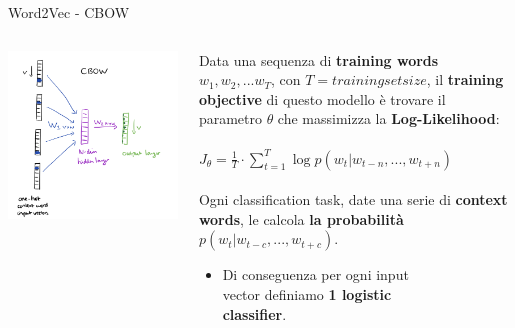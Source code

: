 \documentclass[british]{beamer}
\begin{document}
\begin{frame}{Word2Vec - CBOW}
	\begin{columns}
		\begin{column}{0.4\textwidth}
			\includegraphics[width=1.1\linewidth,height=1.4\textwidth]{./Imgs/cbow}
		\end{column}
		\begin{column}{0.6\textwidth}
			Data una sequenza di \textbf{training words} \(w_1, w_2, ... w_T\), con \(T = trainingsetsize\), il \textbf{training objective} di questo modello \`{e} trovare il parametro \(\theta\) che massimizza la \textbf{Log-Likelihood}:
			\\~\\
			\(J_{\theta} = \frac{1}{T}\cdot\sum_{t=1}^{T}\log p(w_{t}|w_{t-n}, ... , w_{t+n})\)
			\\~\\
			Ogni classification task, date una serie di \textbf{context words}, le  calcola \textbf{la probabilit\`{a}} \(p(w_{t}|w_{t-c}, ... , w_{t+c})\).
			\begin{itemize}
				\item Di conseguenza per ogni input\\ vector definiamo \textbf{1 logistic\\ classifier}.
			\end{itemize}
		\end{column}
	\end{columns}
\end{frame}
\end{document}

